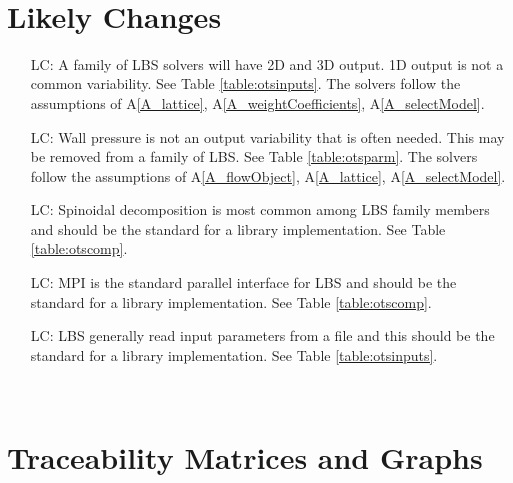 \documentclass[12pt]{article}
\newcounter{lcnum} %
\begin{document}
~\newpage

\section{Likely Changes}    

\noindent \begin{itemize}

\item[LC\refstepcounter{lcnum}\thelcnum\label{LC_output}:] 
A family of LBS solvers will have 2D and 3D output. 1D output is not a common variability. See Table \ref{table:otsinputs}. The solvers follow the assumptions of A\ref{A_lattice}, A\ref{A_weightCoefficients}, A\ref{A_selectModel}.
\item[LC\refstepcounter{lcnum}\thelcnum\label{LC_wallpressure}:] 
Wall pressure is not an output variability that is often needed. This may be removed from a family of LBS. See Table \ref{table:otsparm}. The solvers follow the assumptions of A\ref{A_flowObject}, A\ref{A_lattice}, A\ref{A_selectModel}.
\item[LC\refstepcounter{lcnum}\thelcnum\label{LC_decomposiiton}:] 
Spinoidal decomposition is most common among LBS family members and should be the standard for a library implementation. See Table \ref{table:otscomp}.
\item[LC\refstepcounter{lcnum}\thelcnum\label{LC_parallel}:] 
MPI is the standard parallel interface for LBS and should be the standard for a library implementation. See Table \ref{table:otscomp}.
\item[LC\refstepcounter{lcnum}\thelcnum\label{LC_input}:] 
LBS generally read input parameters from a file and this should be the standard for a library implementation. See Table \ref{table:otsinputs}.

\end{itemize}

~\newpage

\section{Traceability Matrices and Graphs}
\end{document}
